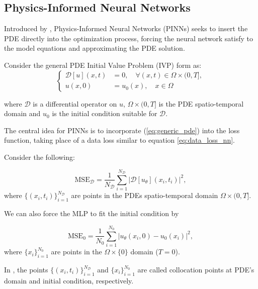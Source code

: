 \subsection{Physics-Informed Neural Networks}

Introduced by \textcite{raissi2017}, Physics-Informed Neural Networks (PINNs)
seeks to insert the PDE directly into the optimization process, forcing the
neural network satisfy to the model equations and approximating the PDE
solution.

Consider the general PDE Initial Value Problem (IVP) form as:
\begin{equation}\label{eq:generic_pde}
    \left\{
    \begin{aligned}
        \mathcal{D}[u](x,t) & = 0, \quad \forall (x,t) \in \Omega \times (0,T], \\
        u(x,0)              & = u_0(x), \quad x \in \Omega
    \end{aligned}
    \right.
\end{equation}

\noindent where $\mathcal{D}$ is a differential operator on $u$, $\Omega \times (0, T]$ is the PDE spatio-temporal domain and $u_0$ is the initial condition suitable for $\mathcal{D}$.

The central idea for PINNs is to incorporate (\ref{eq:generic_pde}) into the
loss function, taking place of a data loss similar to equation
\ref{eq:data_loss_nn}.

Consider the following:

\begin{equation}
    \text{MSE}_\mathcal{D} = \frac{1}{N_\mathcal{D}}\sum_{i=1}^{N_\mathcal{D}}
    \left| \mathcal{D}[u_\theta](x_i,t_i)\right|^2,
\end{equation}
\noindent where $\{(x_i,t_i)\}_{i = 1}^{N_\mathcal{D}}$ are points in the PDEs spatio-temporal domain $\Omega \times (0, T]$.

We can also force the MLP to fit the initial condition by

\begin{equation}
    \text{MSE}_0 = \frac{1}{N_0}\sum_{i=1}^{N_0} \left| u_\theta(x_i,0) - u_0(x_i) \right|^2,
\end{equation}
\noindent where $\{x_i\}_{i=1}^{N_0}$ are points in the $\Omega \times \{0\}$ domain ($T=0$).

In \textcite{raissi2017}, the points $\{(x_i,t_i)\}_{i = 1}^{N_\mathcal{D}}$
and $\{x_i\}_{i=1}^{N_0}$ are called collocation points at PDE's domain and
initial condition, respectively.


